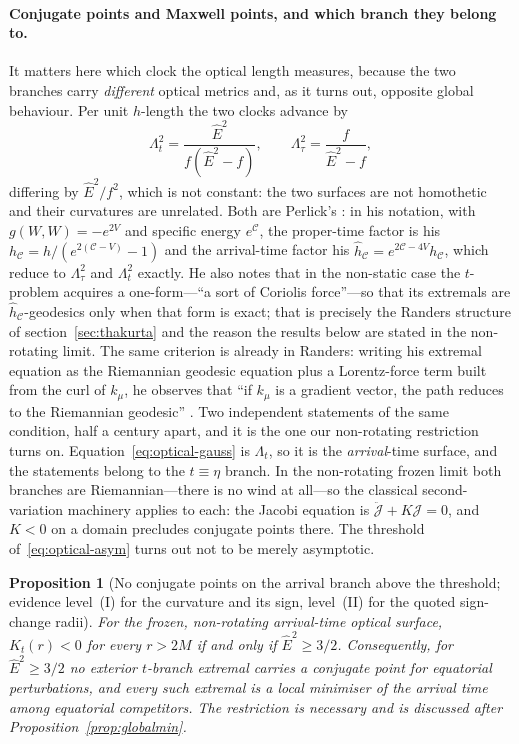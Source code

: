 \documentclass[12pt]{iopart}
\theoremstyle{plain}
\newtheorem{proposition}{Proposition}
\theoremstyle{definition}
\theoremstyle{remark}
\newcommand{\Ehat}{\hat E}
\begin{document}
\paragraph{Conjugate points and Maxwell points, and which branch they belong to.}
It matters here which clock the optical length measures, because the two branches
carry \emph{different} optical metrics and, as it turns out, opposite global
behaviour. Per unit $h$-length the two clocks advance by
\begin{equation}
    \Lambda_t^2=\frac{\Ehat^2}{f(\Ehat^2-f)},
    \qquad
    \Lambda_\tau^2=\frac{f}{\Ehat^2-f},
    \label{eq:two-lambdas}
\end{equation}
differing by $\Ehat^2/f^2$, which is not constant: the two surfaces are not
homothetic and their curvatures are unrelated. Both are Perlick's
\cite{Perlick1991}: in his notation, with $g(W,W)=-e^{2V}$ and specific energy
$e^{\mathcal C}$, the proper-time factor is his $h_{\mathcal C}
=h/(e^{2(\mathcal C-V)}-1)$ and the arrival-time factor his
$\hat h_{\mathcal C}=e^{2\mathcal C-4V}h_{\mathcal C}$, which reduce to
$\Lambda_\tau^2$ and $\Lambda_t^2$ exactly. He also notes that in the
non-static case the $t$-problem acquires a one-form---``a sort of Coriolis
force''---so that its extremals are $\hat h_{\mathcal C}$-geodesics only when
that form is exact; that is precisely the Randers structure of
section~\ref{sec:thakurta} and the reason the results below are stated in the
non-rotating limit. The same criterion is already in Randers: writing his extremal
equation as the Riemannian geodesic equation plus a Lorentz-force term built from
the curl of $k_\mu$, he observes that ``if $k_\mu$ is a gradient vector, the path
reduces to the Riemannian geodesic'' \cite[Eqs.~(13)--(14)]{Randers1941}. Two
independent statements of the same condition, half a century apart, and it is the
one our non-rotating restriction turns on. Equation~\eqref{eq:optical-gauss} is $\Lambda_t$, so it is
the \emph{arrival}-time surface, and the statements belong to the
$t\equiv\eta$ branch. In the non-rotating
frozen limit both branches are Riemannian---there is no wind at all---so the
classical second-variation machinery applies to each: the Jacobi equation is
$\ddot{\mathcal J}+K\mathcal J=0$, and $K<0$ on a domain precludes conjugate
points there. The threshold of~\eqref{eq:optical-asym} turns out not to be merely
asymptotic.

\begin{proposition}[No conjugate points on the arrival branch above the
threshold; evidence level~(I) for the curvature and its sign, level~(II) for the
quoted sign-change radii]
\label{prop:noconj}
For the frozen, non-rotating \emph{arrival-time} optical surface,
$K_t(r)<0$ for \emph{every} $r>2M$ if and only if $\Ehat^2\ge3/2$. Consequently,
for $\Ehat^2\ge3/2$ no exterior $t$-branch extremal carries a conjugate point
\emph{for equatorial perturbations}, and every such extremal is a local minimiser
of the arrival time among equatorial competitors. The restriction is necessary
and is discussed after Proposition~\ref{prop:globalmin}.
\end{proposition}
\end{document}
